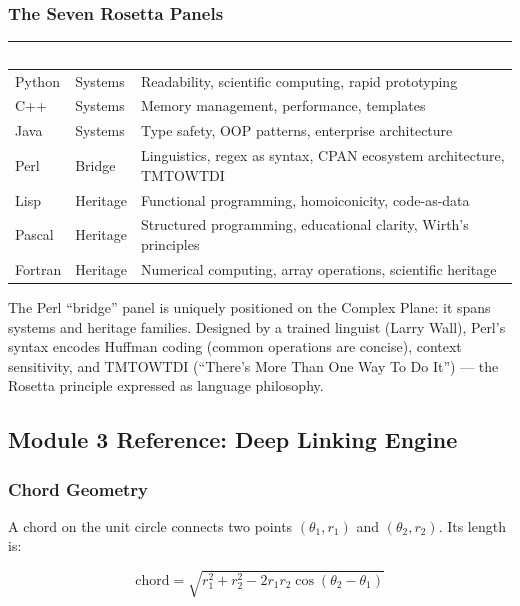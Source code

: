 \documentclass[11pt,letterpaper]{article}
\newcommand{\tableheader}[1]{\textbf{\sffamily\textcolor{white}{#1}}}
\begin{document}
\subsubsection{The Seven Rosetta Panels}

\begin{center}
\begin{tabularx}{\textwidth}{L{2.5cm}L{2.5cm}X}
\toprule
{}
\tableheader{Panel} & \tableheader{Family} & \tableheader{What It Teaches} \\
\midrule
Python & Systems & Readability, scientific computing, rapid prototyping \\
C++ & Systems & Memory management, performance, templates \\
Java & Systems & Type safety, OOP patterns, enterprise architecture \\
Perl & Bridge & Linguistics, regex as syntax, CPAN ecosystem architecture, TMTOWTDI \\
Lisp & Heritage & Functional programming, homoiconicity, code-as-data \\
Pascal & Heritage & Structured programming, educational clarity, Wirth's principles \\
Fortran & Heritage & Numerical computing, array operations, scientific heritage \\
\bottomrule
\end{tabularx}
\end{center}

The Perl ``bridge'' panel is uniquely positioned on the Complex Plane: it spans systems and heritage
families. Designed by a trained linguist (Larry Wall), Perl's syntax encodes Huffman coding
(common operations are concise), context sensitivity, and TMTOWTDI (``There's More Than One Way
To Do It'') --- the Rosetta principle expressed as language philosophy.

\subsection{Module 3 Reference: Deep Linking Engine}

\subsubsection{Chord Geometry}

A chord on the unit circle connects two points $(θ_1, r_1)$ and $(θ_2, r_2)$. Its length is:

\[
  \text{chord} = \sqrt{r_1^2 + r_2^2 - 2r_1 r_2 \cos(\theta_2 - \theta_1)}
\]
\end{document}
